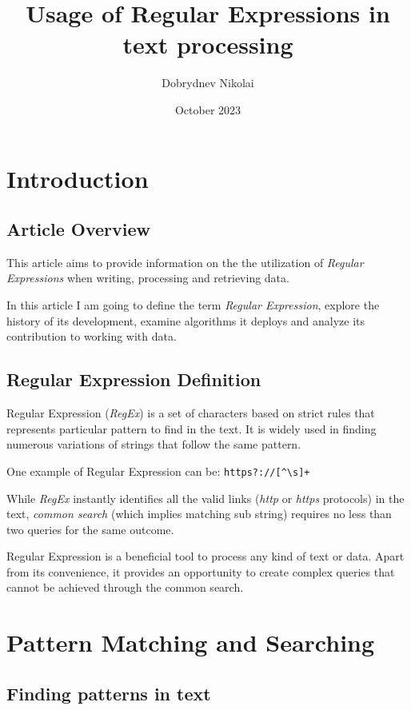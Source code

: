 \documentclass{article}
\title{Usage of Regular Expressions in text processing}
\author{Dobrydnev Nikolai}
\date{October 2023}
\begin{document}
\maketitle
\tableofcontents

\section{Introduction}
\subsection{Article Overview}
\indent This article aims to provide information on the the utilization of \textit{Regular Expressions} when writing, processing and retrieving data. \par
In this article I am going to define the term \textit{Regular Expression}, explore the history of its development, examine algorithms it deploys and analyze its contribution to working with data. 

\subsection{Regular Expression Definition}
\indent Regular Expression (\textit{RegEx}) is a set of characters based on strict rules that represents particular pattern to find in the text. It is widely used in finding numerous variations of strings that follow the same pattern. \par

One example of Regular Expression can be: \verb|https?://[^\s]+| \par
While \textit{RegEx} instantly identifies all the valid links  (\textit{http} or \textit{https} protocols) in the text, \textit{common search} (which implies matching sub string) requires no less than two queries for the same outcome. \par

Regular Expression is a beneficial tool to process any kind of text or data. Apart from its convenience, it provides an opportunity to create complex queries that cannot be achieved through the common search.

\section{Pattern Matching and Searching}
\subsection{Finding patterns in text}
\end{document}
